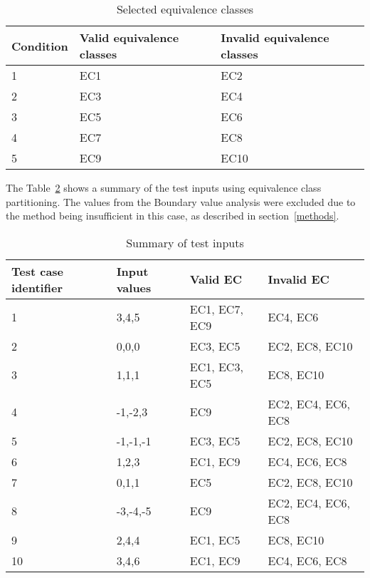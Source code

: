 \begin{table}[!htb]
	\centering
	\label{classestable}
	\caption{Selected equivalence classes}
    \begin{tabular}{|l|l|l|}
        \hline
        Condition  & Valid equivalence classes & Invalid equivalence classes \\ \hline
        1          & EC1                       & EC2                         \\ 
        2          & EC3                       & EC4                         \\ 
        3          & EC5                       & EC6                         \\ 
        4          & EC7                       & EC8                         \\ 
        5          & EC9                       & EC10                        \\
        \hline
    \end{tabular}
\end{table}

\newpage

The Table~\ref{testinputtable} shows a summary of the test inputs using equivalence class partitioning. The values from the Boundary value analysis were excluded due to the method being insufficient in this case, as described in section~\ref{methods}. 

\begin{table}[!htb]
	\label{testinputtable}
	\caption{Summary of test inputs}
    \begin{tabular}{|l|l|l|l|}
        \hline
        Test case identifier & Input values & Valid EC      & Invalid EC         \\ \hline
        1                    & 3,4,5        & EC1, EC7, EC9 & EC4, EC6           \\ 
        2                    & 0,0,0        & EC3, EC5      & EC2, EC8, EC10     \\ 
        3                    & 1,1,1        & EC1, EC3, EC5 & EC8, EC10          \\ 
        4                    & -1,-2,3      & EC9           & EC2, EC4, EC6, EC8 \\ 
        5                    & -1,-1,-1     & EC3, EC5      & EC2, EC8, EC10     \\ 
        6                    & 1,2,3        & EC1, EC9      & EC4, EC6, EC8      \\ 
        7                    & 0,1,1        & EC5           & EC2, EC8, EC10     \\ 
        8                    & -3,-4,-5     & EC9           & EC2, EC4, EC6, EC8 \\ 
        9                    & 2,4,4        & EC1, EC5      & EC8, EC10          \\ 
        10                   & 3,4,6        & EC1, EC9      & EC4, EC6, EC8      \\
        \hline
    \end{tabular}
\end{table}






